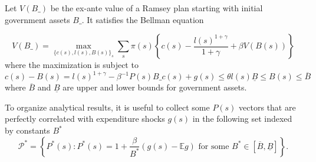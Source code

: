 \documentclass[thmsb,11pt]{article}
\begin{document}
Let $V(B\_)$ be the ex-ante value of  a Ramsey plan starting with initial government assets $B\_$. It satisfies the Bellman equation

\begin{equation}
  \label{eq-QLRA obj}
    V(B\_)=\max_{\{c(s),l(s),B(s)\}_s} \sum_{s}\pi(s)\left\{c(s)-\frac{l(s)^{1+\gamma}}{1+\gamma}+\beta V(B(s)) \right\}
\end{equation}
where the maximization is subject to
   \begin{subequations}
   \label{sys- QLRA constraint}
    \begin{equation}
    \label{rep agent implementability constraint}
    c(s)-B(s)=l(s)^{1+\gamma}-\beta^{-1} P(s)B\_
    \end{equation}
\begin{equation}
  \label{eq-resoruces}
c(s)+g(s)\leq\theta l(s)
\end{equation}
\begin{equation}
  \label{ndl}
\underline{B}\leq B(s)\leq \overline{B}
\end{equation}
   \end{subequations}
where $\overline{B}$ and $\underline{B}$ are upper and lower bounds for government assets.

To organize analytical results, it is useful to  collect some  $P(s)$ vectors that are perfectly correlated with expenditure shocks $g(s)$ in the
following  set %
 indexed by  constants $B^*$  %
\begin{equation}\label{eqn:setP}
 \mathcal{P}^*=\left\{P^*(s): P^*(s) = 1+ \frac{\beta}{ B^*}(g(s) - \mathbb{E} g) \text{ for some } B^*\in[\overline{B},\underline{B}] \right\}.
 \end{equation}



\end{document}
